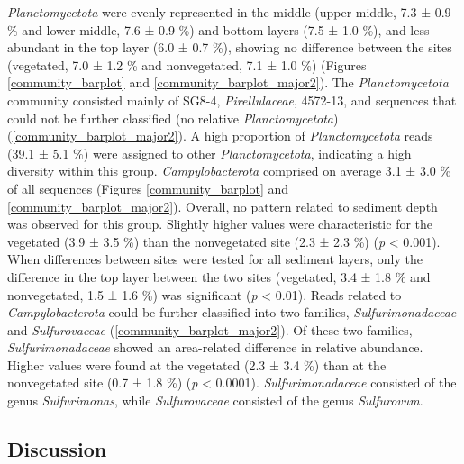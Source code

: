 \documentclass[12pt,]{article}
\begin{document}
\emph{Planctomycetota} were evenly represented in the middle (upper
middle, 7.3 ± 0.9 \si{\percent} and lower middle, 7.6 ± 0.9
\si{\percent}) and bottom layers (7.5 ± 1.0 \si{\percent}), and less
abundant in the top layer (6.0 ± 0.7 \si{\percent}), showing no
difference between the sites (vegetated, 7.0 ± 1.2 \si{\percent} and
nonvegetated, 7.1 ± 1.0 \si{\percent}) (Figures \ref{community_barplot}
and \ref{community_barplot_major2}). The \emph{Planctomycetota}
community consisted mainly of SG8-4, \emph{Pirellulaceae}, 4572-13, and
sequences that could not be further classified (no relative
\emph{Planctomycetota}) (\autoref{community_barplot_major2}). A high
proportion of \emph{Planctomycetota} reads (39.1 ± 5.1 \si{\percent})
were assigned to other \emph{Planctomycetota}, indicating a high
diversity within this group. \emph{Campylobacterota} comprised on
average 3.1 ± 3.0 \si{\percent} of all sequences (Figures
\ref{community_barplot} and \ref{community_barplot_major2}). Overall, no
pattern related to sediment depth was observed for this group. Slightly
higher values were characteristic for the vegetated (3.9 ± 3.5
\si{\percent}) than the nonvegetated site (2.3 ± 2.3 \si{\percent})
(\emph{p} \textless{} 0.001). When differences between sites were tested
for all sediment layers, only the difference in the top layer between
the two sites (vegetated, 3.4 ± 1.8 \si{\percent} and nonvegetated, 1.5
± 1.6 \si{\percent}) was significant (\emph{p} \textless{} 0.01). Reads
related to \emph{Campylobacterota} could be further classified into two
families, \emph{Sulfurimonadaceae} and \emph{Sulfurovaceae}
(\autoref{community_barplot_major2}). Of these two families,
\emph{Sulfurimonadaceae} showed an area-related difference in relative
abundance. Higher values were found at the vegetated (2.3 ± 3.4
\si{\percent}) than at the nonvegetated site (0.7 ± 1.8 \si{\percent})
(\emph{p} \textless{} 0.0001). \emph{Sulfurimonadaceae} consisted of the
genus \emph{Sulfurimonas}, while \emph{Sulfurovaceae} consisted of the
genus \emph{Sulfurovum}.

\newpage

\hypertarget{discussion}{%
\subsection{Discussion}\label{discussion}}
\end{document}
